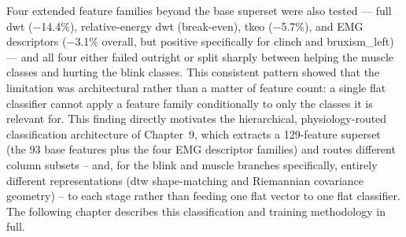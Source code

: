 Four extended feature families beyond the base superset were
also tested --- full \acrshort{dwt} ($-$14.4\%), relative-energy
\acrshort{dwt} (break-even), \acrshort{tkeo} ($-$5.7\%), and EMG
descriptors ($-$3.1\% overall, but positive specifically for
clinch and bruxism\_left) --- and all four either failed
outright or split sharply between helping the muscle classes
and hurting the blink classes. This consistent pattern showed
that the limitation was architectural rather than a matter of
feature count: a single flat classifier cannot apply a feature
family conditionally to only the classes it is relevant for.
This finding directly motivates the hierarchical, physiology-routed
classification architecture of Chapter~9, which extracts a
129-feature superset (the 93 base features plus the four EMG
descriptor families) and routes different column subsets --
and, for the blink and muscle branches specifically, entirely
different representations (\acrshort{dtw} shape-matching and
Riemannian covariance geometry) -- to each stage rather than
feeding one flat vector to one flat classifier. The following
chapter describes this classification and training methodology
in full.